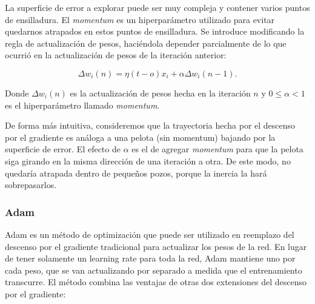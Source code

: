 \documentclass[spanish]{report}
\begin{document}
La superficie de error a explorar puede ser muy compleja y contener varios puntos de ensilladura. El \textit{momentum} \cite{Mitchell97a} es un hiperparámetro utilizado para evitar quedarnos atrapados en estos puntos de ensilladura. Se introduce modificando la regla de actualización de pesos, haciéndola depender parcialmente de lo que ocurrió en la actualización de pesos de la iteración anterior:

\begin{equation}
\Delta w_i(n) = \eta (t - o) x_i + \alpha \Delta w_i (n - 1).
\end{equation}


\noindent Donde $\Delta w_i(n)$ es la actualización de pesos hecha en la iteración $n$ y $0 \leq \alpha < 1$ es el hiperparámetro llamado \textit{momentum}.

De forma más intuitiva, consideremos que la trayectoria hecha por el descenso por el gradiente es análoga a una pelota (sin momentum) bajando por la superficie de error. El efecto de $\alpha$ es el de agregar \textit{momentum} para que la pelota siga girando en la misma dirección de una iteración a otra. De este modo, no quedaría atrapada dentro de pequeños pozos, porque la inercia la hará sobrepasarlos.


\subsubsection{Adam}

Adam \cite{adam_paper} \cite{deep_learning_book} es un método de optimización que puede ser utilizado en reemplazo del descenso por el gradiente tradicional para actualizar los pesos de la red. En lugar de tener solamente un learning rate para toda la red, Adam mantiene uno por cada peso, que se van actualizando por separado a medida que el entrenamiento transcurre. El método combina las ventajas de otras dos extensiones del descenso por el gradiente:
\end{document}
